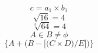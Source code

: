 \documentclass[preview, border=1pt, varwidth]{standalone}
\begin{document}
\[
c = a_1 \times b_1
\]
\[
\sqrt{16} = 4
\]
\[
\sqrt[3]{64} = 4
\]
\[
A \in B \neq \phi
\]
\[
\Bigg\{ A+ \bigg( B - \Big[ \big( C
\times D \big) / E \Big] \bigg) \Bigg\}
\]
\end{document}
